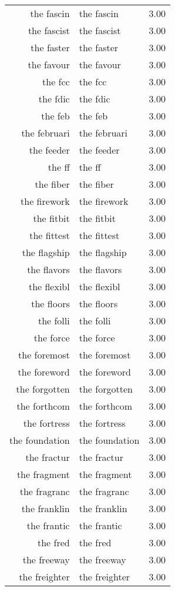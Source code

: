 \begin{table}[ht]
\begin{tabular}{rlr}
  the fascin & the fascin & 3.00 \\ 
  the fascist & the fascist & 3.00 \\ 
  the faster & the faster & 3.00 \\ 
  the favour & the favour & 3.00 \\ 
  the fcc & the fcc & 3.00 \\ 
  the fdic & the fdic & 3.00 \\ 
  the feb & the feb & 3.00 \\ 
  the februari & the februari & 3.00 \\ 
  the feeder & the feeder & 3.00 \\ 
  the ff & the ff & 3.00 \\ 
  the fiber & the fiber & 3.00 \\ 
  the firework & the firework & 3.00 \\ 
  the fitbit & the fitbit & 3.00 \\ 
  the fittest & the fittest & 3.00 \\ 
  the flagship & the flagship & 3.00 \\ 
  the flavors & the flavors & 3.00 \\ 
  the flexibl & the flexibl & 3.00 \\ 
  the floors & the floors & 3.00 \\ 
  the folli & the folli & 3.00 \\ 
  the force & the force & 3.00 \\ 
  the foremost & the foremost & 3.00 \\ 
  the foreword & the foreword & 3.00 \\ 
  the forgotten & the forgotten & 3.00 \\ 
  the forthcom & the forthcom & 3.00 \\ 
  the fortress & the fortress & 3.00 \\ 
  the foundation & the foundation & 3.00 \\ 
  the fractur & the fractur & 3.00 \\ 
  the fragment & the fragment & 3.00 \\ 
  the fragranc & the fragranc & 3.00 \\ 
  the franklin & the franklin & 3.00 \\ 
  the frantic & the frantic & 3.00 \\ 
  the fred & the fred & 3.00 \\ 
  the freeway & the freeway & 3.00 \\ 
  the freighter & the freighter & 3.00 \\ 

\end{tabular}
\end{table}
